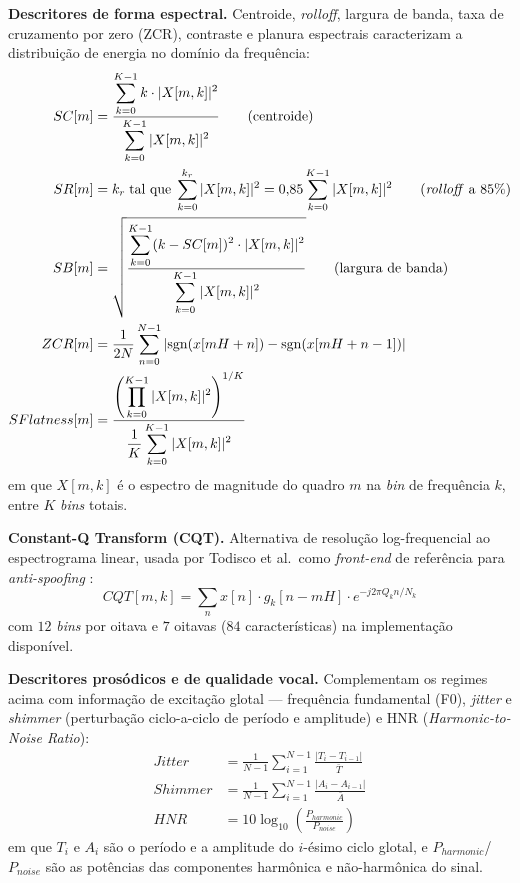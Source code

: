 \documentclass[12pt,a4paper]{article}
\begin{document}
\textbf{Descritores de forma espectral.} Centroide, \textit{rolloff},
largura de banda, taxa de cruzamento por zero (ZCR), contraste e planura
espectrais caracterizam a distribuição de energia no domínio da frequência:
\begin{align}
SC[m] &= \frac{\displaystyle\sum_{k=0}^{K-1} k\cdot|X[m,k]|^2}
             {\displaystyle\sum_{k=0}^{K-1}|X[m,k]|^2}
\qquad \text{(centroide)} \\
SR[m] &= k_r \;\text{tal que}\;
\sum_{k=0}^{k_r}|X[m,k]|^2 = 0{,}85\sum_{k=0}^{K-1}|X[m,k]|^2
\qquad \text{(\textit{rolloff} a \num{85}\%)} \\
SB[m] &=
\sqrt{\frac{\displaystyle\sum_{k=0}^{K-1}(k-SC[m])^2\cdot|X[m,k]|^2}
           {\displaystyle\sum_{k=0}^{K-1}|X[m,k]|^2}}
\qquad \text{(largura de banda)} \\
ZCR[m] &= \frac{1}{2N}\sum_{n=0}^{N-1}
|\mathrm{sgn}(x[mH+n]) - \mathrm{sgn}(x[mH+n-1])| \\
SFlatness[m] &=
\frac{\left(\displaystyle\prod_{k=0}^{K-1}|X[m,k]|^2\right)^{1/K}}
     {\dfrac{1}{K}\displaystyle\sum_{k=0}^{K-1}|X[m,k]|^2}
\end{align}
\noindent
em que $X[m,k]$ é o espectro de magnitude do quadro $m$ na \textit{bin} de
frequência $k$, entre $K$ \textit{bins} totais.

\textbf{Constant-Q Transform (CQT).} Alternativa de resolução
log-frequencial ao espectrograma linear, usada por Todisco et al.\ como
\textit{front-end} de referência para \textit{anti-spoofing}
\cite{todisco2016new}:
\begin{equation}
\label{eq:cqt}
CQT[m,k] = \sum_{n}x[n]\cdot g_k[n-mH]\cdot e^{-j2\pi Q_k n/N_k}
\end{equation}
\noindent
com $12$ \textit{bins} por oitava e $7$ oitavas ($84$ características) na
implementação disponível.

\textbf{Descritores prosódicos e de qualidade vocal.} Complementam os
regimes acima com informação de excitação glotal --- frequência
fundamental (F0), \textit{jitter} e \textit{shimmer} (perturbação
ciclo-a-ciclo de período e amplitude) e HNR
(\textit{Harmonic-to-Noise Ratio}):
\begin{align}
Jitter &= \frac{1}{N-1}\sum_{i=1}^{N-1}\frac{|T_i - T_{i-1}|}{\bar{T}} \\
Shimmer &= \frac{1}{N-1}\sum_{i=1}^{N-1}\frac{|A_i - A_{i-1}|}{\bar{A}} \\
HNR &= 10\log_{10}\!\left(\frac{P_{harmonic}}{P_{noise}}\right)
\end{align}
\noindent
em que $T_i$ e $A_i$ são o período e a amplitude do $i$-ésimo ciclo
glotal, e $P_{harmonic}$/$P_{noise}$ são as potências das componentes
harmônica e não-harmônica do sinal.
\end{document}
